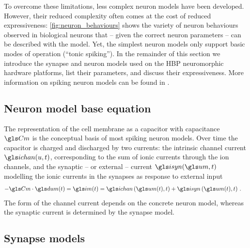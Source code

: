 To overcome these limitations, less complex neuron models have been developed. However, their reduced complexity often comes at the cost of reduced expressiveness: \cref{fig:neuron_behaviours} shows the variety of neuron behaviours observed in biological neurons that -- given the correct neuron parameters -- can be described with the \HH model. Yet, the simplest neuron models only support basic modes of operation (\eg \enquote{tonic spiking}). In the remainder of this section we introduce the synapse and neuron models used on the \acrshort{HBP} neuromorphic hardware platforms, list their parameters, and discuss their expressiveness. More information on spiking neuron models can be found in \cite{gerstner2002spiking}.

\subsection{Neuron model base equation}

The representation of the cell membrane as a capacitor with capacitance $\Cm$ is the conceptual basis of most spiking neuron models. Over time the capacitor is charged and discharged by two currents: the intrinsic channel current $\ichan(u, t)$, corresponding to the sum of ionic currents through the ion channels, and the synaptic -- or external -- current $\isyn(\um, t)$ modelling the ionic currents in the synapses as response to external input
\begin{align}
	- \Cm \cdot \dum(t) &= \im(t) = \ichan\left(\um(t), t\right) + \isyn\left(\um(t), t\right) \,.
	\label{eqn:simple_membrane_base_time}
\end{align}
The form of the channel current \ichan depends on the concrete neuron model, whereas the synaptic current \isyn is determined by the synapse model.

\subsection{Synapse models}
\label{sec:synapse_models}

